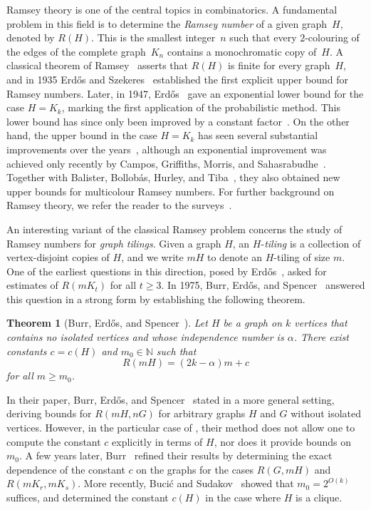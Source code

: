 \documentclass[a4paper,reqno,11pt]{amsart}
\newtheorem{theorem}{Theorem}[section]
\theoremstyle{definition}
\theoremstyle{remark}
\renewcommand\ge{\geqslant}
\begin{document}
Ramsey theory is one of the central topics in combinatorics. A fundamental problem in this field is to determine the \emph{Ramsey number} of a given graph~$H$, denoted by $R(H)$. This is the smallest integer~$n$ such that every $2$-colouring of the edges of the complete graph~$K_n$ contains a monochromatic copy of~$H$. A classical theorem of Ramsey~\cite{Ramsey} asserts that $R(H)$ is finite for every graph~$H$, and in 1935 Erd\H{o}s and Szekeres~\cite{E-Sz} established the first explicit upper bound for Ramsey numbers. Later, in 1947, Erd\H{o}s~\cite{Ramsey.lower} gave an exponential lower bound for the case $H = K_k$, marking the first application of the probabilistic method. This lower bound has since only been improved by a constant factor~\cite{Spencer_Diagonal}. On the other hand, the upper bound in the case $H=K_k$ has seen several substantial improvements over the years~\cite{Thomason_Diagonal,Conlon_Diagonal,Sah_Diagonal}, although an exponential improvement was achieved only recently by Campos, Griffiths, Morris, and Sahasrabudhe~\cite{CGMS}. Together with Balister, Bollobás, Hurley, and Tiba~\cite{BBCGHMST}, they also obtained new upper bounds for multicolour Ramsey numbers. For further background on Ramsey theory, we refer the reader to the surveys~\cite{CFS, Morris2026}.

An interesting variant of the classical Ramsey problem concerns the study of Ramsey numbers for \emph{graph tilings}. Given a graph $H$, an $H$-\textit{tiling} is a collection of vertex-disjoint copies of $H$, and we write $mH$ to denote an $H$-tiling of size $m$. One of the earliest questions in this direction, posed by Erd\H{o}s~\cite{Erdos}, asked for estimates of $R(mK_t)$ for all $t \ge 3$. In 1975, Burr, Erd\H{o}s, and Spencer~\cite{BES} answered this question in a strong form by establishing the following theorem.

\begin{theorem}[Burr, Erd\H{o}s, and Spencer~\cite{BES}]
\label{thm:BESOriginal}
    Let $H$ be a graph on $k$ vertices that contains no isolated vertices and whose independence number is $\alpha$. There exist constants $c = c(H)$ and $m_0 \in \mathbb{N}$ such that
\[
R(mH) = (2k - \alpha)m + c
\]
for all $m \ge m_0$.
\end{theorem}

In their paper, Burr, Erd\H{o}s, and Spencer~\cite{BES} stated  in a more general setting, deriving bounds for $R(mH,nG)$ for arbitrary graphs $H$ and $G$ without isolated vertices. However, in the particular case of , their method does not allow one to compute the constant $c$ explicitly in terms of $H$, nor does it provide bounds on $m_0$. A few years later, Burr~\cite{Burr} refined their results by determining the exact dependence of the constant $c$ on the graphs for the cases $R(G,mH)$ and $R(mK_r,mK_s)$. More recently, Buci\'{c} and Sudakov~\cite{BS} showed that $m_0 = 2^{O(k)}$ suffices, and determined the constant $c(H)$ in the case where $H$ is a clique.
\end{document}
